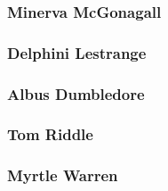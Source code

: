 \pagebreak

\subsubsection*{Minerva McGonagall}



\subsubsection*{Delphini Lestrange}



\subsubsection*{Albus Dumbledore}



\subsubsection*{Tom Riddle}



\subsubsection*{Myrtle Warren}



\pagebreak